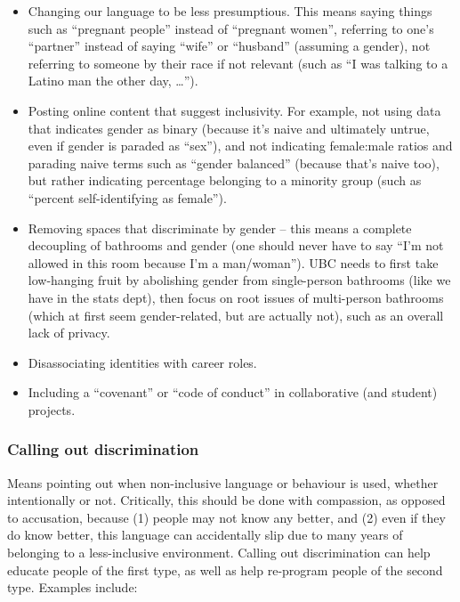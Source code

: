 \documentclass[]{article}
\providecommand{\tightlist}{%
  \setlength{\itemsep}{0pt}\setlength{\parskip}{0pt}}
\begin{document}
\begin{itemize}
\tightlist
\item
  Changing our language to be less presumptious. This means saying things such as ``pregnant people'' instead of ``pregnant women'', referring to one's ``partner'' instead of saying ``wife'' or ``husband'' (assuming a gender), not referring to someone by their race if not relevant (such as ``I was talking to a Latino man the other day, \ldots{}'').
\item
  Posting online content that suggest inclusivity. For example, not using data that indicates gender as binary (because it's naive and ultimately untrue, even if gender is paraded as ``sex''), and not indicating female:male ratios and parading naive terms such as ``gender balanced'' (because that's naive too), but rather indicating percentage belonging to a minority group (such as ``percent self-identifying as female'').
\item
  Removing spaces that discriminate by gender -- this means a complete decoupling of bathrooms and gender (one should never have to say ``I'm not allowed in this room because I'm a man/woman''). UBC needs to first take low-hanging fruit by abolishing gender from single-person bathrooms (like we have in the stats dept), then focus on root issues of multi-person bathrooms (which at first seem gender-related, but are actually not), such as an overall lack of privacy.
\item
  Disassociating identities with career roles.
\item
  Including a ``covenant'' or ``code of conduct'' in collaborative (and student) projects.
\end{itemize}

\hypertarget{calling-out-discrimination}{%
\subsubsection{Calling out discrimination}\label{calling-out-discrimination}}

Means pointing out when non-inclusive language or behaviour is used, whether intentionally or not. Critically, this should be done with compassion, as opposed to accusation, because (1) people may not know any better, and (2) even if they do know better, this language can accidentally slip due to many years of belonging to a less-inclusive environment. Calling out discrimination can help educate people of the first type, as well as help re-program people of the second type. Examples include:
\end{document}

